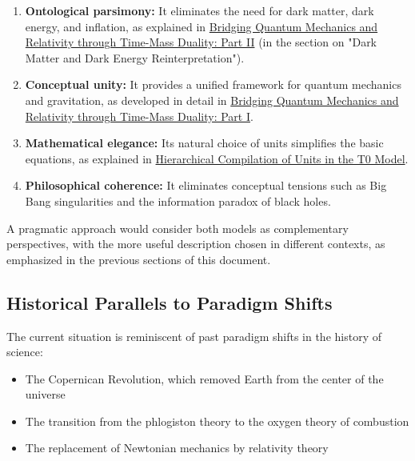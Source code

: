\documentclass[12pt,a4paper]{article}
\begin{document}
	\begin{enumerate}
		\item \textbf{Ontological parsimony:} It eliminates the need for dark matter, dark energy, and inflation, as explained in \href{https://github.com/jpascher/T0-Time-Mass-Duality/tree/main/2/pdf/English/QMRelTimeMassPart2En.pdf}{Bridging Quantum Mechanics and Relativity through Time-Mass Duality: Part II} (in the section on "Dark Matter and Dark Energy Reinterpretation").
		
		\item \textbf{Conceptual unity:} It provides a unified framework for quantum mechanics and gravitation, as developed in detail in \href{https://github.com/jpascher/T0-Time-Mass-Duality/tree/main/2/pdf/English/QMRelTimeMassPart1En.pdf}{Bridging Quantum Mechanics and Relativity through Time-Mass Duality: Part I}.
		
		\item \textbf{Mathematical elegance:} Its natural choice of units simplifies the basic equations, as explained in \href{https://github.com/jpascher/T0-Time-Mass-Duality/tree/main/2/pdf/English/NatEinheitenSystematikEn.pdf}{Hierarchical Compilation of Units in the T0 Model}.
		
		\item \textbf{Philosophical coherence:} It eliminates conceptual tensions such as Big Bang singularities and the information paradox of black holes.
	\end{enumerate}
	
	A pragmatic approach would consider both models as complementary perspectives, with the more useful description chosen in different contexts, as emphasized in the previous sections of this document.
	
	\subsection{Historical Parallels to Paradigm Shifts}
	\label{subsec:historical_parallels}
	
	The current situation is reminiscent of past paradigm shifts in the history of science:
	
	\begin{itemize}
		\item The Copernican Revolution, which removed Earth from the center of the universe
		\item The transition from the phlogiston theory to the oxygen theory of combustion
		\item The replacement of Newtonian mechanics by relativity theory
	\end{itemize}
	
\end{document}
